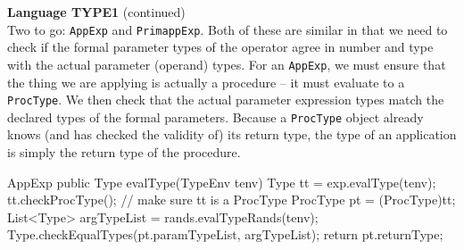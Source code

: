\begin{minipage}[t]{\sw}
\slidenumber
\LARGE
{\bf Language TYPE1} (continued)\\[1.5ex]
Two to go: \verb'AppExp' and \verb'PrimappExp'.
Both of these are similar
in that we need to check if the formal parameter types of the operator
agree in number and type with the actual parameter (operand) types.\exx
For an \verb'AppExp', we must ensure
that the thing we are applying is actually a procedure --
it must evaluate to a \verb'ProcType'.
We then check that the actual parameter expression types
match the declared types of the formal parameters.
Because a \verb'ProcType' object already knows
(and has checked the validity of) its return type,
the type of an application is simply the return type of the procedure.
\Large
\begin{qv}
AppExp
    public Type evalType(TypeEnv tenv) {
        Type tt = exp.evalType(tenv);
        tt.checkProcType(); // make sure tt is a ProcType
        ProcType pt = (ProcType)tt;
        List<Type> argTypeList = rands.evalTypeRands(tenv);
        Type.checkEqualTypes(pt.paramTypeList, argTypeList);
        return pt.returnType;
    }
\end{qv}
\end{minipage}
